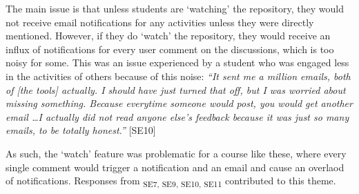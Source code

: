 The main issue is that unless students are `watching' the repository, they would not receive email notifications for any activities unless they were directly mentioned. However, if they do `watch' the repository, they would receive an influx of notifications for every user comment on the discussions, which is too noisy for some. This was an issue experienced by a student who was engaged less in the activities of others because of this noise: \textit{``It sent me a million emails, both of [the tools] actually. I should have just turned that off, but I was worried about missing something. Because everytime someone would post, you would get another email \ldots I actually did not read anyone else's feedback because it was just so many emails, to be totally honest.''} [SE10]

As such, the `watch' feature was problematic for a course like these, where every single comment would trigger a notification and an email and cause an overlaod of notifications. Responses from \textsubscript{SE7, SE9, SE10, SE11} contributed to this theme.







